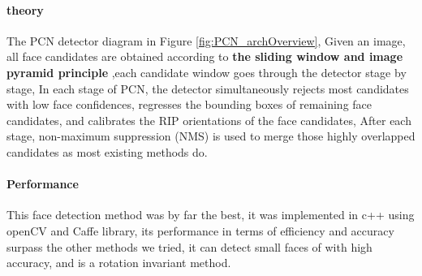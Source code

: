\paragraph{theory}
The PCN detector diagram in Figure \ref{fig:PCN_archOverview}, Given an image, all face candidates are obtained according to \textbf{the sliding window and image pyramid principle} ,each candidate window goes through the detector stage by stage, In each stage of PCN, the detector simultaneously rejects most candidates with low face confidences, regresses the bounding boxes of remaining face candidates, and calibrates the RIP orientations of the face candidates, After each stage, non-maximum suppression (NMS) is used to merge those highly overlapped candidates as most existing methods do.
\paragraph{Performance}
This face detection method was by far the best, it was implemented in c++ using openCV and Caffe library, its performance in terms of efficiency and accuracy surpass the other methods we tried, it can detect small faces of with high accuracy, and is a rotation invariant method.
